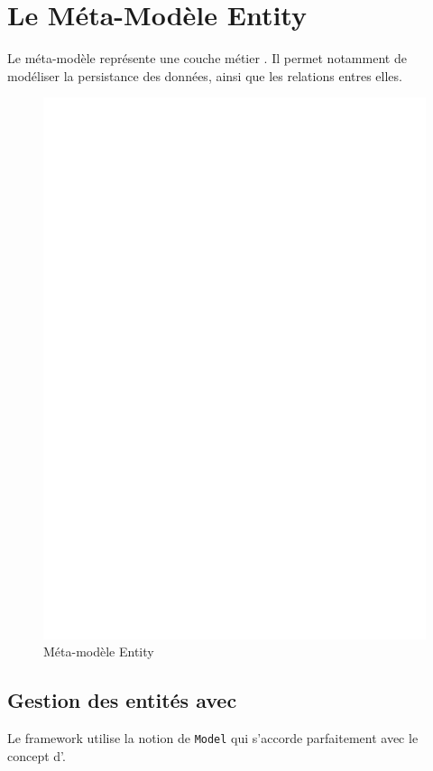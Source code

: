 \section{Le Méta-Modèle Entity}\label{sub:ent}
Le méta-modèle \kwentity{} représente une couche \og métier \fg{}. Il permet notamment de modéliser la persistance des données, ainsi que les relations entres elles.

\begin{figure}[htb]
  \centering
  \includegraphics[scale=.4]{img/Entity.eps}
  \caption{Méta-modèle Entity}
  \label{fig:ent}
\end{figure}


\subsection{Gestion des entités avec \kwplay{}}
Le framework \kwplay{} utilise la notion de \verb+Model+ qui s'accorde parfaitement avec le concept d'\kwentity{}. 

